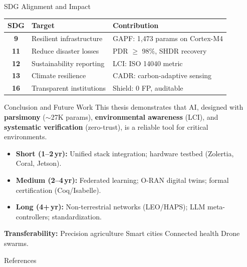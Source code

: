 \documentclass[final]{beamer}
\newlength{\sepwidth}
\newlength{\colwidth}
\newcommand{\separatorcolumn}{\begin{column}{\sepwidth}\end{column}}
\begin{document}
\begin{frame}[t]
\begin{columns}[t]
\begin{column}{\colwidth}
  \begin{block}{SDG Alignment and Impact}
    \footnotesize
    \begin{table}
      \centering
      \renewcommand{\arraystretch}{1.05}
      \begin{tabular}{cll}
        \toprule
        \textbf{SDG} & \textbf{Target} & \textbf{Contribution} \\
        \midrule
        \textbf{9} & Resilient infrastructure & GAPF: 1,473 params on Cortex-M4 \\
        \textbf{11} & Reduce disaster losses & PDR $\geq$ 98\%, SHDR recovery \\
        \textbf{12} & Sustainability reporting & LCI: ISO 14040 metric \\
        \textbf{13} & Climate resilience & CADR: carbon-adaptive sensing \\
        \textbf{16} & Transparent institutions & Shield: 0 FP, auditable \\
        \bottomrule
      \end{tabular}
    \end{table}
  \end{block}

  \begin{block}{Conclusion and Future Work}
    This thesis demonstrates that AI, designed with \textbf{parsimony} ($\sim$27K params),
    \textbf{environmental awareness} (LCI), and \textbf{systematic verification} (zero-trust),
    is a reliable tool for critical environments.

    \smallskip
    \begin{itemize}
      \item \textbf{Short (1--2\,yr):} Unified stack integration; hardware testbed (Zolertia, Coral, Jetson).
      \item \textbf{Medium (2--4\,yr):} Federated learning; O-RAN digital twins; formal certification (Coq/Isabelle).
      \item \textbf{Long (4+\,yr):} Non-terrestrial networks (LEO/HAPS); LLM meta-controllers; standardization.
    \end{itemize}

    \smallskip
    \textbf{Transferability:} Precision agriculture \;\textbar\; Smart cities \;\textbar\; Connected health \;\textbar\; Drone swarms.
  \end{block}

  \begin{block}{References}
    \vspace{0}
    \nocite{*}
    \footnotesize{}
  \end{block}

\end{column}

\separatorcolumn
\end{columns}
\end{frame}
\end{document}
